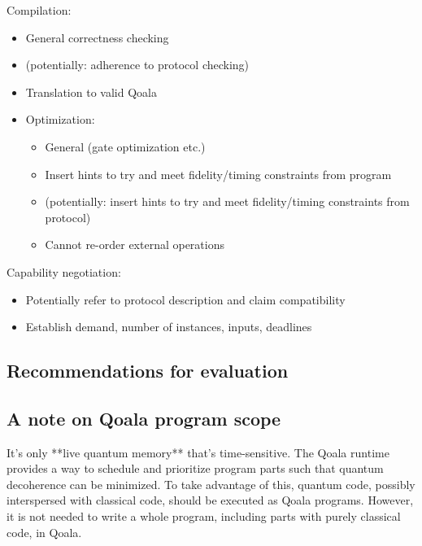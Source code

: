 Compilation:
\begin{itemize}
  \item General correctness checking
  \item (potentially: adherence to protocol checking)
  \item Translation to valid Qoala
  \item Optimization:
    \begin{itemize}
      \item General (gate optimization etc.)
      \item Insert hints to try and meet fidelity/timing constraints from program
      \item (potentially: insert hints to try and meet fidelity/timing constraints from protocol)
      \item Cannot re-order external operations
    \end{itemize}
\end{itemize}

Capability negotiation:
\begin{itemize}
  \item Potentially refer to protocol description and claim compatibility
  \item Establish demand, number of instances, inputs, deadlines
\end{itemize}


\subsection{Recommendations for evaluation}



\subsection{A note on Qoala program scope}
It's only **live quantum memory** that's time-sensitive.
The Qoala runtime provides a way to schedule and prioritize program parts such that quantum decoherence can be minimized.
To take advantage of this, quantum code, possibly interspersed with classical code, should be executed as Qoala programs.
However, it is not needed to write a whole program, including parts with purely classical code, in Qoala.